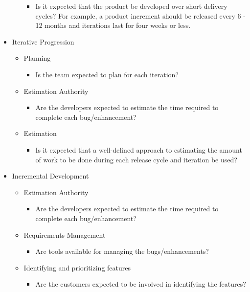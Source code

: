 \begin{appendices}
\begin{itemize}
\begin{itemize}
\begin{itemize}
					\item Is it expected that the product be developed over short delivery cycles? For example, a product increment should be released every 6 - 12 months and iterations last for four weeks or less.
				\end{itemize}
		\end{itemize}
	\item Iterative Progression
		\begin{itemize}
			\item Planning
				\begin{itemize}
					\item Is the team expected to plan for each iteration?
				\end{itemize}
			\item Estimation Authority
				\begin{itemize}
					\item Are the developers expected to estimate the time required to complete each bug/enhancement?
				\end{itemize}
			\item Estimation
				\begin{itemize}
					\item Is it expected that a well-defined approach to estimating the amount of work to be done during each release cycle and iteration be used?
				\end{itemize}
		\end{itemize}
	\item Incremental Development
		\begin{itemize}
			\item Estimation Authority
				\begin{itemize}
					\item Are the developers expected to estimate the time required to complete each bug/enhancement?
				\end{itemize}
			\item Requirements Management
				\begin{itemize}
					\item Are tools available for managing the bugs/enhancements?
				\end{itemize}
			\item Identifying and prioritizing features
				\begin{itemize}
					\item Are the customers expected to be involved in identifying the features?

\end{itemize}
\end{itemize}
\end{itemize}
\end{appendices}
